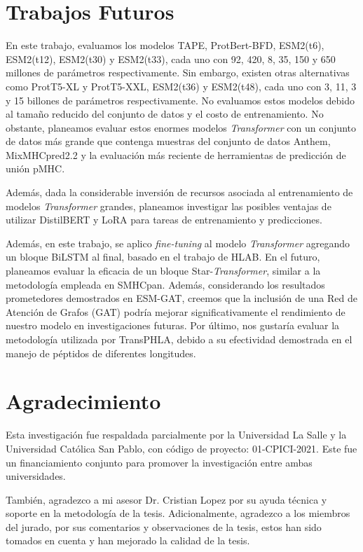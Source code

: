 \section{Trabajos Futuros}
En este trabajo, evaluamos los modelos TAPE, ProtBert-BFD, ESM2(t6), ESM2(t12), ESM2(t30) y ESM2(t33), cada uno con 92, 420, 8, 35, 150 y 650 millones de parámetros respectivamente. Sin embargo, existen otras alternativas como ProtT5-XL y ProtT5-XXL, ESM2(t36) y ESM2(t48), cada uno con 3, 11, 3 y 15 billones de parámetros respectivamente. No evaluamos estos modelos debido al tamaño reducido del conjunto de datos y el costo de entrenamiento. No obstante, planeamos evaluar estos enormes modelos \textit{Transformer} con un conjunto de datos más grande que contenga muestras del conjunto de datos Anthem, MixMHCpred2.2 y la evaluación más reciente de herramientas de predicción de unión pMHC.

Además, dada la considerable inversión de recursos asociada al entrenamiento de modelos \textit{Transformer} grandes, planeamos investigar las posibles ventajas de utilizar DistilBERT y LoRA para tareas de entrenamiento y predicciones.

Además, en este trabajo, se aplico \textit{fine-tuning} al modelo \textit{Transformer} agregando un bloque BiLSTM al final, basado en el trabajo de HLAB. En el futuro, planeamos evaluar la eficacia de un bloque Star-\textit{Transformer}, similar a la metodología empleada en SMHCpan. Además, considerando los resultados prometedores demostrados en ESM-GAT, creemos que la inclusión de una Red de Atención de Grafos (GAT) podría mejorar significativamente el rendimiento de nuestro modelo en investigaciones futuras. Por último, nos gustaría evaluar la metodología utilizada por TransPHLA, debido a su efectividad demostrada en el manejo de péptidos de diferentes longitudes.


\section{Agradecimiento}

Esta investigación fue respaldada parcialmente por la Universidad La Salle y la Universidad Católica San Pablo, con código de proyecto: 01-CPICI-2021. Este fue un financiamiento conjunto para promover la investigación entre ambas universidades. 

También, agradezco a mi asesor Dr. Cristian Lopez por su ayuda técnica y soporte en la metodología de la tesis. Adicionalmente, agradezco a los miembros del jurado, por sus comentarios y observaciones de la tesis, estos han sido tomados en cuenta y han mejorado la calidad de la tesis.








